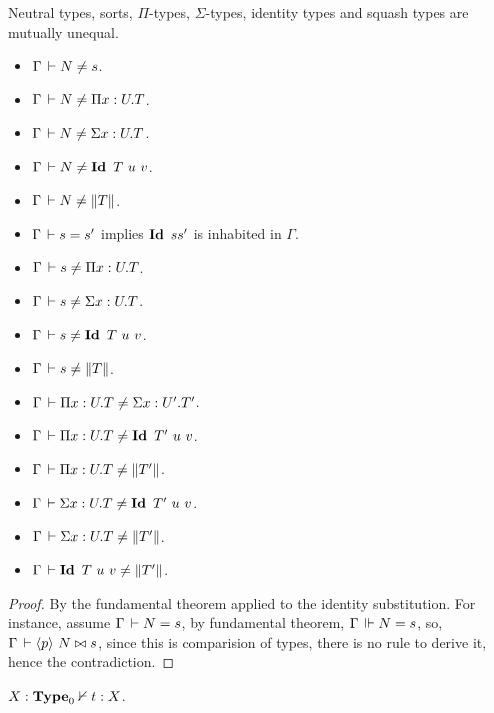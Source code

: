 \documentclass[a4paper,english]{lipics-utf8x}
\begin{document}
  \begin{lemma}
    \label{lem:cons-discr}
    Neutral types, sorts, $\Pi$-types, $\Sigma$-types, identity types and
    squash types are mutually unequal.
    \leavevmode
    \begin{itemize}
      \item $\Gamma \,\vdash N \neq s$.
      \item $\Gamma \,\vdash N \neq \Pi x:U.T$.
      \item $\Gamma \,\vdash N \neq \Sigma x:U.T$.
      \item $\Gamma \der N \neq \Id T\ u\ v$.
      \item $\Gamma \,\vdash N \neq \|T\|$.
      \item $\Gamma \,\vdash s = s'$ implies $\operatorname{\mathbf{Id}~} s s'$ is inhabited in $\Gamma$.
      \item $\Gamma \,\vdash s \neq \Pi x:U.T$.
      \item $\Gamma \,\vdash s \neq \Sigma x:U.T$.
      \item $\Gamma \der s \neq \Id T\ u\ v$.
      \item $\Gamma \,\vdash s \neq \|T\|$.
      \item $\Gamma \,\vdash \Pi x:U.T \neq \Sigma x:U'.T'$.
      \item $\Gamma \der \Pi x:U.T \neq \Id T'\ u\ v$.
      \item $\Gamma \,\vdash \Pi x:U.T \neq \|T'\|$.
      \item $\Gamma \der \Sigma x:U.T \neq \Id T'\ u\ v$.
      \item $\Gamma \,\vdash \Sigma x:U.T \neq \|T'\|$.
      \item $\Gamma \,\vdash \operatorname{\mathbf{Id}~} T\ u\ v \neq \|T'\|$.
    \end{itemize}
  \end{lemma}

  \begin{proof}
    By the fundamental theorem applied to the identity substitution.
    For instance, assume $\Gamma \,\vdash N = s$, by fundamental theorem,
    $\Gamma \,\Vdash N = s$, so, $\Gamma \,\vdash \langle p \rangle~ N \mathrel{\bowtie} s$, since this is
    comparision of types, there is no rule to derive it, hence the
    contradiction.
  \end{proof}

  \begin{theorem}[Consistency]
    $X : \operatorname{\mathbf{Type}}_0 \nvdash t : X$.
  \end{theorem}
\end{document}
